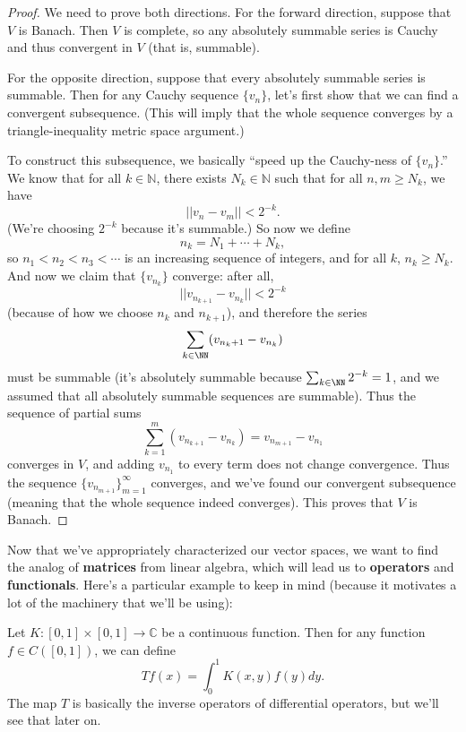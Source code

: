 \begin{proof}
We need to prove both directions. For the forward direction, suppose that $V$ is Banach. Then $V$ is complete, so any absolutely summable series is Cauchy and thus convergent in $V$ (that is, summable). 

For the opposite direction, suppose that every absolutely summable series is summable. Then for any Cauchy sequence $\{v_n\}$, let's first show that we can find a convergent subsequence. (This will imply that the whole sequence converges by a triangle-inequality metric space argument.)

To construct this subsequence, we basically ``speed up the Cauchy-ness of $\{v_n\}$.'' We know that for all $k \in \mathbb{N}$, there exists $N_k \in \mathbb{N}$ such that for all $n, m \ge N_k$, we have 
\[
    ||v_n - v_m|| < 2^{-k}.
\]
(We're choosing $2^{-k}$ because it's summable.) So now we define 
\[
    n_k = N_1 + \cdots + N_k,
\]
so $n_1 < n_2 < n_3 < \cdots$ is an increasing sequence of integers, and for all $k$, $n_k \ge N_k$. And now we claim that $\{v_{n_k}\}$ converge: after all, 
\[
    ||v_{n_{k+1}} - v_{n_k}|| < 2^{-k} 
\]
(because of how we choose $n_k$ and $n_{k+1}$),  and therefore the series
\[
    \sum_{k \in \NN} (v_{n_k+1} - v_{n_k})
\]
must be summable (it's absolutely summable because $\sum_{k \in \NN} 2^{-k} = 1$, and we assumed that all absolutely summable sequences are summable). Thus the sequence of partial sums 
\[
    \sum_{k=1}^m (v_{n_{k+1}} - v_{n_k}) = v_{n_{m+1}} - v_{n_1}
\]
converges in $V$, and adding $v_{n_1}$ to every term does not change convergence. Thus the sequence $\{v_{n_{m+1}}\}_{m=1}^{\infty}$ converges, and we've found our convergent subsequence (meaning that the whole sequence indeed converges). This proves that $V$ is Banach. 
\end{proof}

Now that we've appropriately characterized our vector spaces, we want to find the analog of \textbf{matrices} from linear algebra, which will lead us to \textbf{operators} and \textbf{functionals}. Here's a particular example to keep in mind (because it motivates a lot of the machinery that we'll be using):

\begin{example}\label{firstlinop}
Let $K: [0, 1] \times [0, 1] \to \mathbb{C}$ be a continuous function. Then for any function $f \in C([0, 1])$, we can define 
\[
    Tf(x) = \int_0^1 K(x, y) f(y) dy.
\]
The map $T$ is basically the inverse operators of differential operators, but we'll see that later on.
\end{example}

